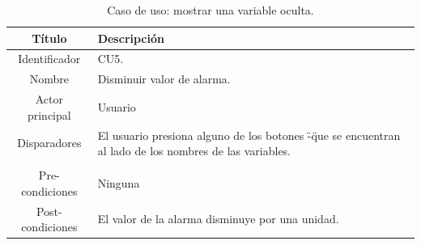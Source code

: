 \begin{table}[htpb]
	\centering
	\caption{Caso de uso: mostrar una variable oculta.}
	\centering
	\begin{tabular}{c p{}}    
		\toprule
		\textbf{Título }     & \textbf{Descripción} \\
		\midrule
		Identificador		&	CU5. \\
		Nombre				& 	Disminuir valor de alarma. \\
		Actor principal		&   Usuario \\
		Disparadores		&   El usuario presiona alguno de los botones \"-\" que se encuentran al lado de los nombres de las variables. \\
\\
		Pre-condiciones		&   Ninguna \\
		Post-condiciones	&   El valor de la alarma disminuye por una unidad.\\
		\bottomrule
	\end{tabular}
\label{tab:caso-decrementar}
\end{table}

